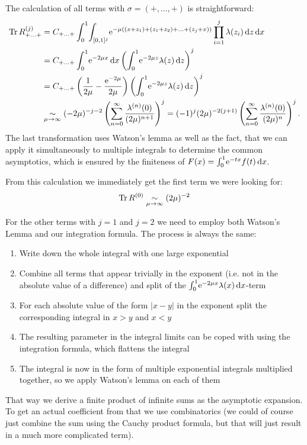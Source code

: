 The calculation of all terms with $\sigma=(+,\ldots,+)$ is straightforward:
\begin{align*}
  \Tr R^{(j)}_{+\ldots+} &=
    C_{+\ldots+}
    \Int{x}{
      \Integ{[0,1]^{j}}{z}{
        \Eto{-\mu((x + z_1) + (z_1 + z_2) + \ldots + (z_j + x))}
        \prod_{i=1}^j \lambda(z_i)
      }
    } \\
    &= C_{+\ldots+}
      \Int{x}{\Eto{-2\mu x}} \left(\Int{z}{\Eto{-2\mu z}\lambda(z)}\right)^j \\
    &= C_{+\ldots+}
      \left(\frac1{2\mu} - \frac{\Eto{-2\mu}}{2\mu}\right)
      \left(\Int{z}{\Eto{-2\mu z}\lambda(z)}\right)^j \\
      &\SimMu (-2\mu)^{-j-2}
      \left(\Wsum{\lambda^{(n)}}\right)^j = (-1)^j (2\mu)^{-2(j+1)}
      \left(\sum_{n=0}^\infty\frac{\lambda^{(n)}(0)}{(2\mu)^n}\right)^j.
\end{align*}
The last transformation uses Watson's lemma as well as the fact, that we can
apply it simultaneously to multiple integrals to determine the common
asymptotics, which is ensured by the finiteness of $F(x) =
\Int{x}{\Eto{-tx}f(t)}$. %

From this calculation we immediately get the first term we were looking for:
\begin{align}
  \label{eqn:tr1}
  \Tr R^{(0)} \SimAs{\mu\to\infty} (2\mu)^{-2}
\end{align}

For the other terms with $j=1$ and $j=2$ we need to employ both Watson's Lemma
and our integration formula. The process is always the same:
\begin{enumerate}
  \item Write down the whole integral with one large exponential
  \item Combine all terms that appear trivially in the exponent (i.e. not in the
    absolute value of a difference) and split of the $\Int{x}{\Eto{-2\mu
    x}\lambda(x)}$-term
  \item For each absolute value of the form $\left|x-y\right|$ in the exponent 
    split the corresponding integral in $x > y$ and $x < y$
  \item The resulting parameter in the integral limits can be coped with using
    the integration formula, which flattens the integral
  \item The integral is now in the form of multiple exponential integrals
    multiplied together, so we apply Watson's lemma on each of them
\end{enumerate}
That way we derive a finite product of infinite sums as the asymptotic
expansion. To get an actual coefficient from that we use combinatorics (we could
of course just combine the sum using the Cauchy product formula, but that will
just result in a much more complicated term).

